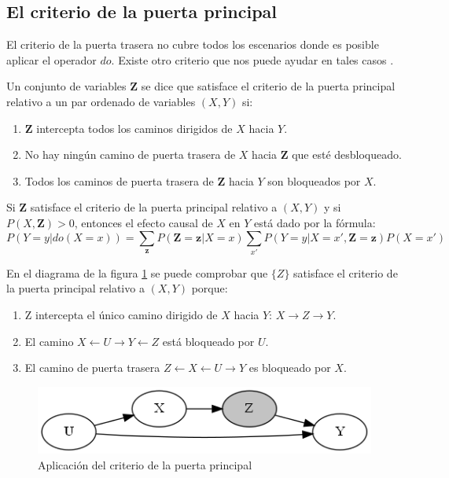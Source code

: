 \subsection{El criterio de la puerta principal}
El criterio de la puerta trasera no cubre todos los escenarios donde es posible aplicar el operador $do$. Existe otro criterio que nos puede ayudar en tales casos \cite{pearl2016causal}.
\begin{dfn}
	Un conjunto de variables $\textbf{Z}$ se dice que satisface el criterio de la puerta principal relativo a un par ordenado de variables $(X,Y)$ si:
	\begin{enumerate}
		\item $\textbf{Z}$ intercepta todos los caminos dirigidos de $X$ hacia $Y$.
		\item No hay ningún camino de puerta trasera de $X$ hacia $\textbf{Z}$ que esté desbloqueado.
		\item Todos los caminos de puerta trasera de $\textbf{Z}$ hacia $Y$ son bloqueados por $X$.
	\end{enumerate}
\end{dfn}

\begin{theorem}
	Si $\textbf{Z}$ satisface el criterio de la puerta principal relativo a $(X,Y)$ y si $P(X,\textbf{Z}) > 0$, entonces el efecto causal de $X$ en $Y$ está dado por la fórmula:
	\[P(Y=y|do(X=x)) = \sum_{\textbf{z}} P(\textbf{Z}=\textbf{z}|X=x) \sum_{x'} P(Y=y|X=x',\textbf{Z}=\textbf{z})P(X=x')\]
\end{theorem}

En el diagrama de la figura \ref{fig:frontdoor-ex} se puede comprobar que $\{Z\}$ satisface el criterio de la puerta principal relativo a $(X,Y)$ porque:
\begin{enumerate}
	\item Z intercepta el único camino dirigido de $X$ hacia $Y$: $X \rightarrow Z \rightarrow Y$.
	\item El camino $X \leftarrow U \rightarrow Y \leftarrow Z$ está bloqueado por $U$.
	\item El camino de puerta trasera $Z \leftarrow X \leftarrow U \rightarrow Y$ es bloqueado por $X$.
\end{enumerate}
\begin{figure}[!h]
	\centering
	\includegraphics[width=0.50\linewidth]{images/Chapter 2/frontdoor.png.png}
	\caption{Aplicación del criterio de la puerta principal}
	\label{fig:frontdoor-ex}
\end{figure}		

